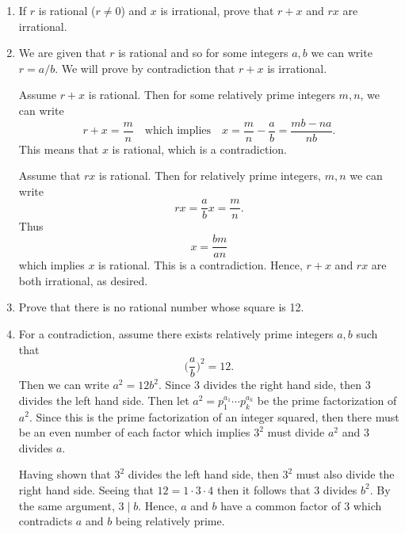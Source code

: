 \documentclass[leqno]{article}
\makeatletter
\theoremstyle{definition}
\theoremstyle{remark}
\newenvironment{solution}[1][\bf{\textit{Solution}}]{\par
  
  \normalfont \topsep6\p@\@plus6\p@\relax
  \list{}{\leftmargin=0mm
          \rightmargin=0mm
          \settowidth{\itemindent}{\itshape#1}%
          \labelwidth=\itemindent
          \parsep=0pt \listparindent=\parindent 
  }
  \item[\hskip\labelsep
        \itshape
    #1\@addpunct{.}]\ignorespaces
}{%
  \popQED\endlist\@endpefalse
}
\makeatother
\begin{document}
        \begin{enumerate}[leftmargin=*]
            \item If $r$ is rational ($r\neq 0$) and $x$ is irrational, prove that $r+x$ and $rx$ are irrational.
                \begin{solution}
                    We are given that $r$ is rational and so for some integers $a,b$ we can write $r=a/b$. We will prove by contradiction that $r+x$ is irrational.\par\hspace{4mm} Assume $r+x$ is rational. Then for some relatively prime integers $m,n$, we can write
                        \begin{equation*}
                            r+x=\frac{m}{n}\quad\text{which implies}\quad x=\frac{m}{n}-\frac{a}{b}=\frac{mb-na}{nb}.
                        \end{equation*}
                    This means that $x$ is rational, which is a contradiction.\par\hspace{4mm} Assume that $rx$ is rational. Then for relatively prime integers, $m,n$ we can write
                        \begin{equation*}
                            rx=\frac{a}{b}x=\frac{m}{n}.
                        \end{equation*}
                    Thus 
                        \begin{equation*}
                            x=\frac{bm}{an}
                        \end{equation*}
                    which implies $x$ is rational. This is a contradiction. Hence, $r+x$ and $rx$ are both irrational, as desired.
                \end{solution}
            \item Prove that there is no rational number whose square is 12.
                \begin{solution}
                    For a contradiction, assume there exists relatively prime integers $a,b$ such that
                        \begin{equation*}
                            \bigg(\frac{a}{b}\bigg)^2=12.
                        \end{equation*}
                    Then we can write $a^2=12b^2$. Since 3 divides the right hand side, then 3 divides the left hand side. Then let $a^2=p_1^{a_1}\cdots p_k^{a_k}$ be the prime factorization of $a^2$. Since this is the prime factorization of an integer squared, then there must be an even number of each factor which implies $3^2$ must divide $a^2$ and $3$ divides $a$.\par\hspace{4mm} Having shown that $3^2$ divides the left hand side, then $3^2$ must also divide the right hand side. Seeing that $12=1\cdot3\cdot4$ then it follows that $3$ divides $b^2$. By the same argument, $3\mid b$. Hence, $a$ and $b$ have a common factor of 3 which contradicts $a$ and $b$ being relatively prime.

\end{solution}
\end{enumerate}
\end{document}
